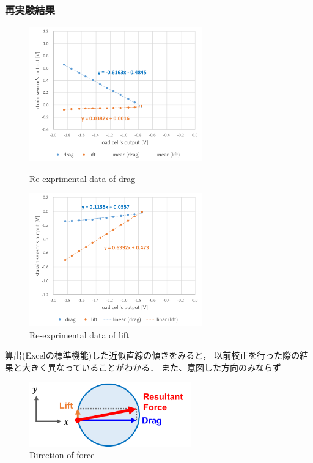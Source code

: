 \documentclass[twocolumn,a4j]{jsarticle}
\begin{document}
\subsubsection*{再実験結果}
\begin{figure}[htbp]
    \footnotesize
    \begin{center}
        \includegraphics[width=75mm]{../images/graph_21119_drag_1.png}
        \caption{Re-exprimental data of drag}
        \includegraphics[width=75mm]{../images/graph_21119_lift_1.png}
        \caption{Re-exprimental data of lift}
    \end{center}
\end{figure}

算出(Excelの標準機能)した近似直線の傾きをみると，
以前校正を行った際の結果と大きく異なっていることがわかる．
また、意図した方向のみならず

\begin{figure}[htbp]
    \footnotesize
    \begin{center}
        \includegraphics[width=70mm]{../images/image_11.png}
        \caption{Direction of force}
    \end{center}
\end{figure}
\end{document}
